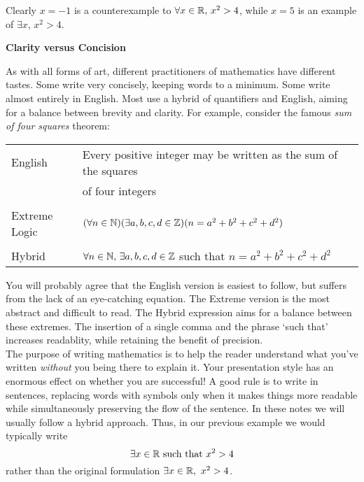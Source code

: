  Clearly $x=-1$ is a counterexample to $\forall x\in\mathbb{R},\,x^2>4$, while $x=5$ is an example of $\exists x,\,x^2>4$.

\begin{aside}{}{}
{\bf Clarity versus Concision}

As with all forms of art, different practitioners of mathematics have different tastes. Some write very concisely, keeping words to a minimum. Some write almost entirely in English. Most use a hybrid of quantifiers and English, aiming for a balance between brevity and clarity. For example, consider the famous \emph{sum of four squares} theorem:
\begin{center}
\begin{tabular}{l|l}
English & Every positive integer may be written as the sum of the squares\\
&of four integers\\[4pt]\hline
\\[-8pt]
Extreme Logic & $(\forall n\in\mathbb{N})(\exists a,b,c,d\in\mathbb{Z})(n=a^2+b^2+c^2+d^2)$\\[4pt]\hline
\\[-8pt]
Hybrid & $\forall n\in\mathbb{N},\, \exists a,b,c,d\in\mathbb{Z}$ such that $n=a^2+b^2+c^2+d^2$
\end{tabular}
\end{center}
You will probably agree that the English version is easiest to follow, but suffers from the lack of an eye-catching equation. The Extreme  version is the most abstract and difficult to read. The Hybrid expression aims for a balance between these extremes. The insertion of a single comma and the phrase `such that' increases readablity, while retaining the benefit of precision.\\

 The purpose of writing mathematics is to help the reader understand what you've written \emph{without} you being there to explain it. Your presentation style has an enormous effect on whether you are successful! A good rule is to write in sentences, replacing words with symbols only when it makes things more readable while simultaneously preserving the flow of the sentence. In these notes we will usually follow a hybrid approach. Thus, in our previous example we would typically write
\[\exists x\in\mathbb{R}\text{ such that } x^2>4\]
rather than the original formulation $\exists x\in\mathbb{R},\ x^2>4$.
\end{aside}\goodbreak



